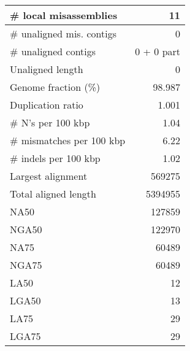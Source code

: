 \documentclass[12pt,a4paper]{article}
\begin{document}
\begin{table}[ht]
\begin{center}
\begin{tabular}{|l*{1}{|r}|}
\# local misassemblies & 11 \\ \hline
\# unaligned mis. contigs & 0 \\ \hline
\# unaligned contigs & 0 + 0 part \\ \hline
Unaligned length & 0 \\ \hline
Genome fraction (\%) & 98.987 \\ \hline
Duplication ratio & 1.001 \\ \hline
\# N's per 100 kbp & 1.04 \\ \hline
\# mismatches per 100 kbp & 6.22 \\ \hline
\# indels per 100 kbp & 1.02 \\ \hline
Largest alignment & 569275 \\ \hline
Total aligned length & 5394955 \\ \hline
NA50 & 127859 \\ \hline
NGA50 & 122970 \\ \hline
NA75 & 60489 \\ \hline
NGA75 & 60489 \\ \hline
LA50 & 12 \\ \hline
LGA50 & 13 \\ \hline
LA75 & 29 \\ \hline
LGA75 & 29 \\ \hline
\end{tabular}
\end{center}
\end{table}
\end{document}

